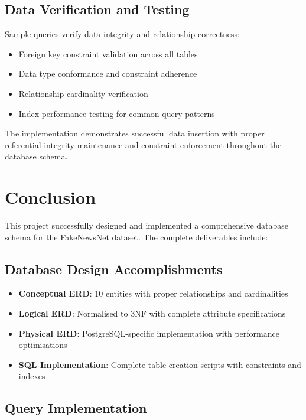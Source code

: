 \documentclass[12pt,a4paper]{report}
\begin{document}
\section{Data Verification and Testing}

Sample queries verify data integrity and relationship correctness:
\begin{itemize}
    \item Foreign key constraint validation across all tables
    \item Data type conformance and constraint adherence
    \item Relationship cardinality verification
    \item Index performance testing for common query patterns
\end{itemize}

The implementation demonstrates successful data insertion with proper referential integrity maintenance and constraint enforcement throughout the database schema.

\chapter{Conclusion}

This project successfully designed and implemented a comprehensive database schema for the FakeNewsNet dataset. The complete deliverables include:

\section{Database Design Accomplishments}

\begin{itemize}
    \item \textbf{Conceptual ERD}: 10 entities with proper relationships and cardinalities
    \item \textbf{Logical ERD}: Normalised to 3NF with complete attribute specifications
    \item \textbf{Physical ERD}: PostgreSQL-specific implementation with performance optimisations
    \item \textbf{SQL Implementation}: Complete table creation scripts with constraints and indexes
\end{itemize}

\section{Query Implementation}
\end{document}
